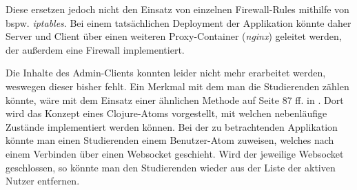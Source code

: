 Diese ersetzen jedoch nicht den Einsatz von einzelnen Firewall-Rules mithilfe von \ac{bspw.} \textit{iptables}.
Bei einem tatsächlichen Deployment der Applikation könnte daher Server und Client über einen weiteren Proxy-Container (\textit{nginx}) geleitet werden, der außerdem eine Firewall implementiert.
\par
Die Inhalte des Admin-Clients konnten leider nicht mehr erarbeitet werden, weswegen dieser bisher fehlt.
Ein Merkmal mit dem man die Studierenden zählen könnte, wäre mit dem Einsatz einer ähnlichen Methode auf Seite 87 ff. in \cite{Butcher:2014:SCM:2621977}.
Dort wird das Konzept eines Clojure-Atoms vorgestellt, mit welchen nebenläufige Zustände implementiert werden können.
Bei der zu betrachtenden Applikation könnte man einen Studierenden einem Benutzer-Atom zuweisen, welches nach einem Verbinden über einen Websocket geschieht.
Wird der jeweilige Websocket geschlossen, so könnte man den Studierenden wieder aus der Liste der aktiven Nutzer entfernen.
\clearpage
